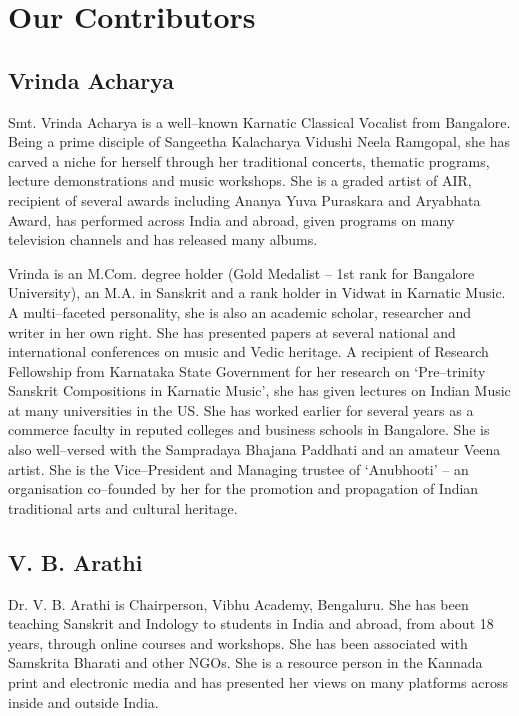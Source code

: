 
\chapter*{Our Contributors }\label{contributors}

\section*{Vrinda Acharya}

Smt. Vrinda Acharya is a well–known Karnatic Classical Vocalist from Bangalore. Being a prime disciple of Sangeetha Kalacharya Vidushi Neela Ramgopal, she has carved a niche for herself through her traditional concerts, thematic programs, lecture demonstrations and music workshops. She is a graded artist of AIR, recipient of several awards including Ananya Yuva Puraskara and Aryabhata Award, has performed across India and abroad, given programs on many television channels and has released many albums.

Vrinda is an M.Com. degree holder (Gold Medalist – 1st rank for Bangalore University), an M.A. in Sanskrit and a rank holder in Vidwat in Karnatic Music. A multi–faceted personality, she is also an academic scholar, researcher and writer in her own right. She has presented papers at several national and international conferences on music and Vedic heritage. A recipient of Research Fellowship from Karnataka State Government for her research on ‘Pre–trinity Sanskrit Compositions in Karnatic Music’, she has given lectures on Indian Music at many universities in the US. She has worked earlier for several years as a commerce faculty in reputed colleges and business schools in Bangalore. She is also well–versed with the Sampradaya Bhajana Paddhati and an amateur Veena artist. She is the Vice–President and Managing trustee of ‘Anubhooti’ – an organisation co–founded by her for the promotion and propagation of Indian traditional arts and cultural heritage.


\section*{V. B. Arathi}

Dr. V. B. Arathi is Chairperson, Vibhu Academy, Bengaluru. She has been teaching Sanskrit and Indology to students in India and abroad, from about 18 years, through online courses and workshops. She has been associated with Samskrita Bharati and other NGOs. She is a resource person in the Kannada print and electronic media and has presented her views on many platforms across inside and outside India.

